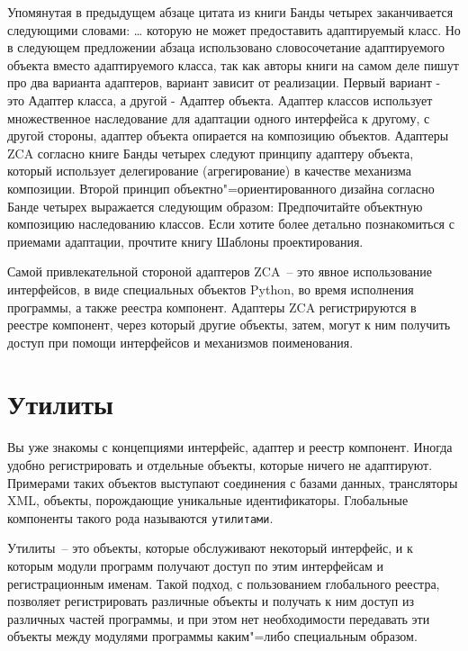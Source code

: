 \documentclass[a4paper,openany,twoside,draft]{book}
\begin{document}
Упомянутая в предыдущем абзаце цитата из книги Банды четырех заканчивается следующими словами: \textquotedbl{} \ldots{} которую не может предоставить адаптируемый класс\textquotedbl{}.  Но в следующем предложении абзаца использовано словосочетание \textquotedbl{}адаптируемого объекта\textquotedbl{} вместо \textquotedbl{}адаптируемого класса\textquotedbl{}, так как авторы книги на самом деле пишут про два варианта адаптеров, вариант зависит от реализации.  Первый вариант - это \textquotedbl{}Адаптер класса\textquotedbl{}, а другой - \textquotedbl{}Адаптер объекта\textquotedbl{}.  Адаптер классов использует множественное наследование для адаптации одного интерфейса к другому, с другой стороны, адаптер объекта опирается на композицию объектов.  Адаптеры ZCA согласно книге Банды четырех следуют принципу адаптеру объекта, который использует делегирование (агрегирование) в качестве механизма композиции.  Второй принцип объектно"=ориентированного дизайна согласно Банде четырех выражается следующим образом: \textquotedbl{}Предпочитайте объектную композицию наследованию классов\textquotedbl{}.  Если хотите более детально познакомиться с приемами адаптации, прочтите книгу \textquotedbl{}Шаблоны проектирования\textquotedbl{}.

Самой привлекательной стороной адаптеров ZCA~-- это явное использование интерфейсов, в виде специальных объектов Python, во время исполнения программы, а также реестра компонент.  Адаптеры ZCA регистрируются в реестре компонент, через который другие объекты, затем, могут к ним получить доступ при помощи интерфейсов и механизмов поименования.


\chapter{Утилиты%
  \label{id39}%
}


Вы уже знакомы с концепциями \textquotedbl{}интерфейс\textquotedbl{}\textquotedbl{}, \textquotedbl{}адаптер\textquotedbl{} и \textquotedbl{}реестр компонент\textquotedbl{}.  Иногда удобно регистрировать и отдельные объекты, которые ничего не адаптируют.  Примерами таких объектов выступают соединения с базами данных, трансляторы XML, объекты, порождающие уникальные идентификаторы.  Глобальные компоненты такого рода называются \texttt{утилитами}.

Утилиты~-- это объекты, которые обслуживают некоторый интерфейс, и к которым модули программ получают доступ по этим интерфейсам и регистрационным именам.  Такой подход, с пользованием глобального реестра, позволяет регистрировать различные объекты и получать к ним доступ из различных частей программы, и при этом нет необходимости передавать эти объекты между модулями программы каким"=либо специальным образом.
\end{document}
